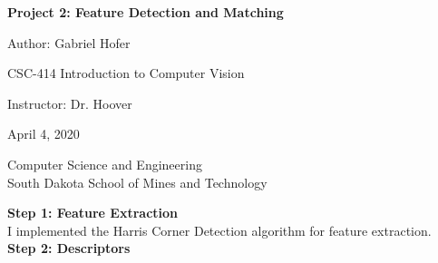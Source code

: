 \documentclass[12pt]{article}
\begin{document}
\begin{titlepage}
   \begin{center}
       \vspace*{1cm}
       \large
       \textbf{Project 2: Feature Detection and Matching}
       \normalsize

       \vspace{0.5cm}

       Author: Gabriel Hofer

       \vspace{0.5cm}

       CSC-414 Introduction to Computer Vision

       \vspace{0.5cm}

       Instructor: Dr. Hoover

       \vspace{0.5cm}

       April 4, 2020
       \vfill

       Computer Science and Engineering\\
       South Dakota School of Mines and Technology\\
   \end{center}
\end{titlepage}
\newpage
\small
\textbf{Step 1: Feature Extraction}\\ 

I implemented the Harris Corner Detection algorithm for feature extraction. \\

\textbf{Step 2: Descriptors}\\
\end{document}
